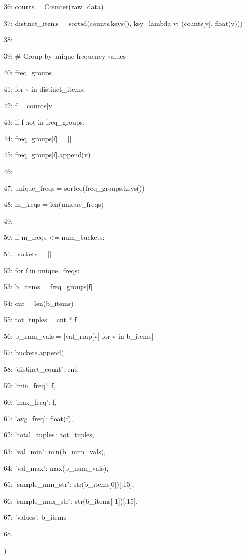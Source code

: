 \documentclass[11pt,a4paper]{article}
\begin{document}
36:         counts = Counter(raw\_data)

37:         distinct\_items = sorted(counts.keys(), key=lambda v: (counts[v], float(v)))

38:

39:     \# Group by unique frequency values

40:     freq\_groups = {}

41:     for v in distinct\_items:

42:         f = counts[v]

43:         if f not in freq\_groups:

44:             freq\_groups[f] = []

45:         freq\_groups[f].append(v)

46:

47:     unique\_freqs = sorted(freq\_groups.keys())

48:     m\_freqs = len(unique\_freqs)

49:

50:     if m\_freqs <= num\_buckets:

51:         buckets = []

52:         for f in unique\_freqs:

53:             b\_items = freq\_groups[f]

54:             cnt = len(b\_items)

55:             tot\_tuples = cnt * f

56:             b\_num\_vals = [val\_map[v] for v in b\_items]

57:             buckets.append({

58:                 'distinct\_count': cnt,

59:                 'min\_freq': f,

60:                 'max\_freq': f,

61:                 'avg\_freq': float(f),

62:                 'total\_tuples': tot\_tuples,

63:                 'val\_min': min(b\_num\_vals),

64:                 'val\_max': max(b\_num\_vals),

65:                 'sample\_min\_str': str(b\_items[0])[:15],

66:                 'sample\_max\_str': str(b\_items[-1])[:15],

67:                 'values': b\_items

68:             })
\end{document}
